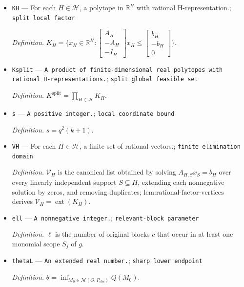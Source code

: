 \documentclass{article}
\begin{document}
\begin{itemize}
  \par\smallskip\noindent\emph{Definition.} \(b_H\) is the restriction of the raw kernel vectors \((b_c)_c\) to the rows retained in \(A_H\).
  \item \texttt{KH} --- For each \(H\in\mathcal H\), a polytope in \(\mathbb R^H\) with rational H-representation.; \texttt{split local factor}
  \par\smallskip\noindent\emph{Definition.} \(K_H=\{x_H\in\mathbb R^H:\begin{bmatrix}A_H\\-A_H\\-I_H\end{bmatrix}x_H\le\begin{bmatrix}b_H\\-b_H\\0\end{bmatrix}\}\).
  \item \texttt{Ksplit} --- \texttt{A product of finite-\allowbreak{}dimensional real polytopes with rational H-\allowbreak{}representations.}; \texttt{split global feasible set}
  \par\smallskip\noindent\emph{Definition.} \(K^{\mathrm{split}}=\prod_{H\in\mathcal H}K_H\).
  \item \texttt{s} --- \texttt{A positive integer.}; \texttt{local coordinate bound}
  \par\smallskip\noindent\emph{Definition.} \(s=q^2(k+1)\).
  \item \texttt{VH} --- For each \(H\in\mathcal H\), a finite set of rational vectors.; \texttt{finite elimination domain}
  \par\smallskip\noindent\emph{Definition.} \(\mathcal V_H\) is the canonical list obtained by solving \(A_{H,S}x_S=b_H\) over every linearly independent support \(S\subseteq H\), extending each nonnegative solution by zeros, and removing duplicates; \(\text{lem:rational-factor-vertices}\) derives \(\mathcal V_H=\operatorname{ext}(K_H)\).
  \item \texttt{ell} --- \texttt{A nonnegative integer.}; \texttt{relevant-\allowbreak{}block parameter}
  \par\smallskip\noindent\emph{Definition.} \(\ell\) is the number of original blocks \(c\) that occur in at least one monomial scope \(S_j\) of \(g\).
  \item \texttt{thetaL} --- \texttt{An extended real number.}; \texttt{sharp lower endpoint}
  \par\smallskip\noindent\emph{Definition.} \(\underline\theta=\inf_{M_0\in\mathcal M(G,P_{\mathrm{obs}})}Q(M_0)\).

\end{itemize}
\end{document}
